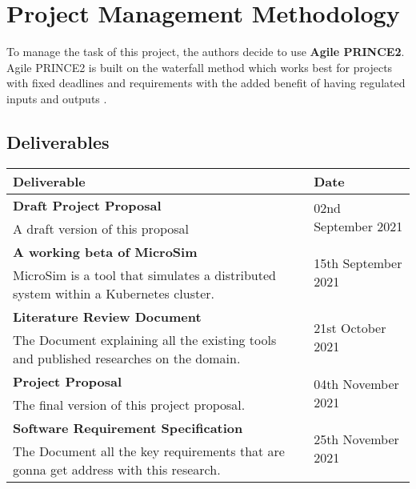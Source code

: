 \section{Project Management Methodology}

To manage the task of this project, the authors decide to use \textbf{Agile PRINCE2}. Agile PRINCE2 is built on the waterfall method which works best for projects with fixed deadlines and requirements with the added benefit of having regulated inputs and outputs \citep{WhatAreT79:online}.

\subsection{Deliverables}
\setlength\LTleft{0mm}
\begin{longtable}{|p{115mm}|p{35mm}|}
\hline
\textbf{Deliverable} & 
    \textbf{Date} \\ \hline
    \textbf{Draft Project Proposal} & 
    \multirow{2}{*}{02nd September 2021} \\
    A draft version of this proposal & 
     \\ \hline

    \textbf{A working beta of MicroSim}\label{microsim} & 
    \multirow{2}{*}{15th September 2021} \\
    MicroSim is a tool that simulates a distributed system within a Kubernetes cluster. & 
     \\ \hline


    \textbf{Literature Review Document} & 
    \multirow{2}{*}{21st October 2021} \\
    The Document explaining all the existing tools and published researches on the domain. & 
     \\ \hline

    \textbf{Project Proposal} & 
    \multirow{2}{*}{04th November 2021} \\
    The final version of this project proposal. & 
     \\ \hline

    \textbf{Software Requirement Specification} & 
    \multirow{2}{*}{25th November 2021} \\
    The Document all the key requirements that are gonna get address with this research. & 
     \\ \hline


\end{longtable}
